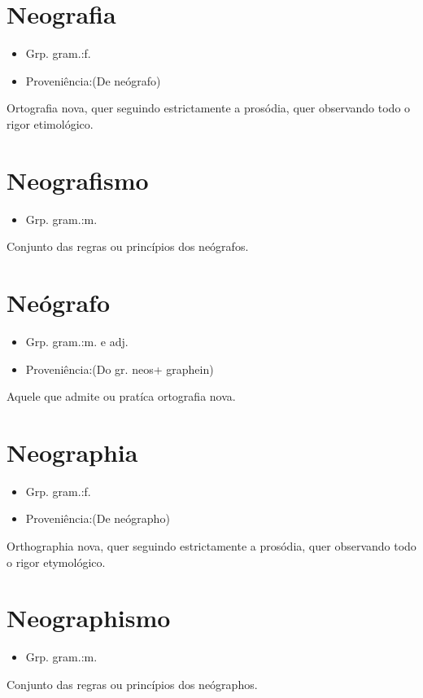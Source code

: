 \section{Neografia}
\begin{itemize}
\item {Grp. gram.:f.}
\end{itemize}
\begin{itemize}
\item {Proveniência:(De \textunderscore neógrafo\textunderscore )}
\end{itemize}
Ortografia nova, quer seguindo estrictamente a prosódia, quer observando todo o rigor etimológico.
\section{Neografismo}
\begin{itemize}
\item {Grp. gram.:m.}
\end{itemize}
Conjunto das regras ou princípios dos neógrafos.
\section{Neógrafo}
\begin{itemize}
\item {Grp. gram.:m.  e  adj.}
\end{itemize}
\begin{itemize}
\item {Proveniência:(Do gr. \textunderscore neos\textunderscore  + \textunderscore graphein\textunderscore )}
\end{itemize}
Aquele que admite ou pratíca ortografia nova.
\section{Neographia}
\begin{itemize}
\item {Grp. gram.:f.}
\end{itemize}
\begin{itemize}
\item {Proveniência:(De \textunderscore neógrapho\textunderscore )}
\end{itemize}
Orthographia nova, quer seguindo estrictamente a prosódia, quer observando todo o rigor etymológico.
\section{Neographismo}
\begin{itemize}
\item {Grp. gram.:m.}
\end{itemize}
Conjunto das regras ou princípios dos neógraphos.
